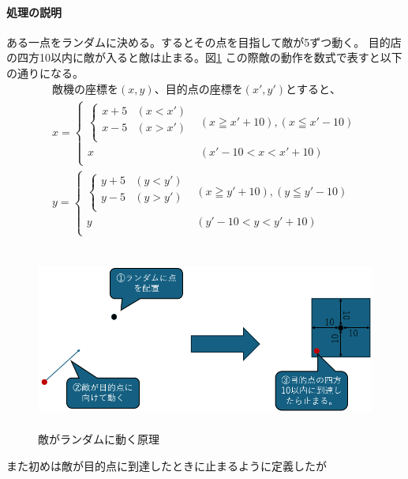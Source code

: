 \documentclass[a4paper,titlepage,11pt]{ltjsarticle}
\begin{document}
\paragraph{処理の説明}
ある一点をランダムに決める。するとその点を目指して敵が5ずつ動く。
目的店の四方10以内に敵が入ると敵は止まる。図\ref{random_move}
この際敵の動作を数式で表すと以下の通りになる。
\begin{gather*}
	敵機の座標を(x,y)、目的点の座標を(x',y')とすると、\\
	x = 
	\begin{cases}
		\begin{cases}
			x + 5 & (x < x') \\
			x - 5 & (x > x') \\
		\end{cases}
		& (x \geqq x' + 10),(x \leqq x' - 10) \\
		x & (x' -10 < x < x' + 10) \\
	\end{cases}
	\\
	y = 
	\begin{cases}
		\begin{cases}
			y + 5 & (y < y') \\
			y - 5 & (y > y') \\
		\end{cases}
		& (x \geqq y' + 10),(y \leqq y' - 10) \\
		y & (y' -10 < y < y' + 10) \\
	\end{cases}
\end{gather*}
\begin{figure}[H]
\begin{center}
\includegraphics*[height = 6cm]{random_move.png}
\caption{敵がランダムに動く原理}
\label{random_move}
\end{center}
\end{figure}
また初めは敵が目的点に到達したときに止まるように定義したが
\end{document}
